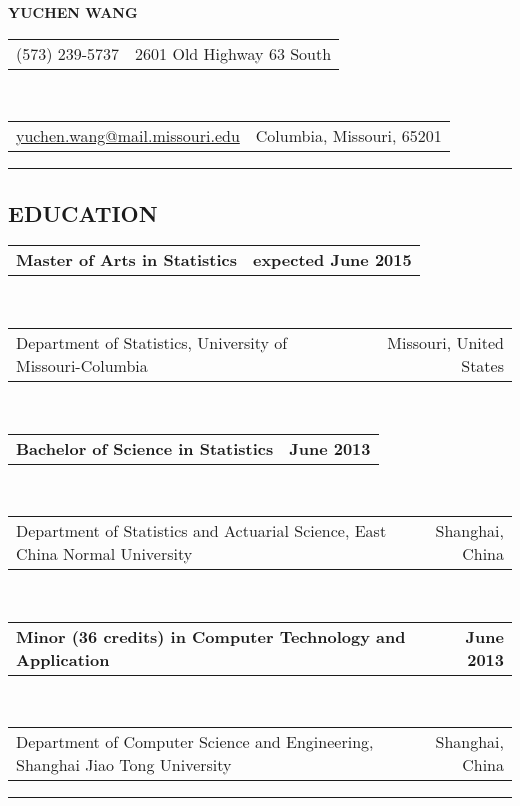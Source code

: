 \documentclass[10pt]{article}
\makeatletter
\newcommand{\headerrow}[2]
{\begin{tabular*}{\linewidth}{l@{\extracolsep{\fill}}r}
	#1 &
	#2 \\
\end{tabular*}}
\makeatother
\begin{document}
\begin{center}
\huge \textbf{YUCHEN WANG\\}
\end{center}

\noindent\headerrow
{(573) 239-5737}
{2601 Old Highway 63 South}
\\
\headerrow
{\href{mailto://yuchen.wang@mail.missouri.edu}{yuchen.wang@mail.missouri.edu}}
{Columbia, Missouri, 65201}

\vspace{0.2em}
\hrule
\vspace{-1em}


\subsection*{\centering EDUCATION}

\headerrow
	{\textbf{Master of Arts in Statistics}}
	{\textbf{expected June 2015}}
\\
\headerrow
	{Department of Statistics, University of Missouri-Columbia}
	{Missouri, United States}
\\
\headerrow
	{\textbf{Bachelor of Science in Statistics}}
	{\textbf{June 2013}}
\\
\headerrow
	{Department of Statistics and Actuarial Science, East China Normal University}
	{Shanghai, China}
\\
\headerrow
	{\textbf{Minor (36 credits) in Computer Technology and Application}}
	{\textbf{June 2013}}
\\
\headerrow
	{Department of Computer Science and Engineering, Shanghai Jiao Tong University}
	{Shanghai, China}


\vspace{0.2em}
\hrule
\vspace{-1em}
\end{document}
